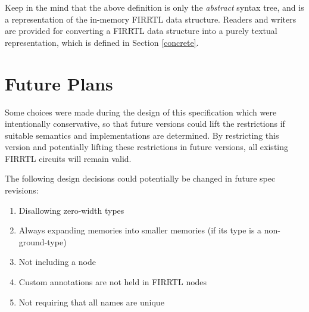 \documentclass[12pt]{article}
\begin{document}
Keep in the mind that the above definition is only the {\em abstract} syntax tree, and is a representation of the in-memory FIRRTL data structure.
Readers and writers are provided for converting a FIRRTL data structure into a purely textual representation, which is defined in Section \ref{concrete}.


\section{Future Plans}
Some choices were made during the design of this specification which were intentionally conservative, so that future versions could lift the restrictions if suitable semantics and implementations are determined.
By restricting this version and potentially lifting these restrictions in future versions, all existing FIRRTL circuits will remain valid.

The following design decisions could potentially be changed in future spec revisions:
\begin{enumerate}[topsep=3pt,itemsep=-0.5ex,partopsep=1ex,parsep=1ex]
\item Disallowing zero-width types
\item Always expanding memories into smaller memories (if its type is a non-ground-type)
\item Not including a  node
\item Custom annotations are not held in FIRRTL nodes
\item Not requiring that all names are unique
\end{enumerate}
\end{document}
